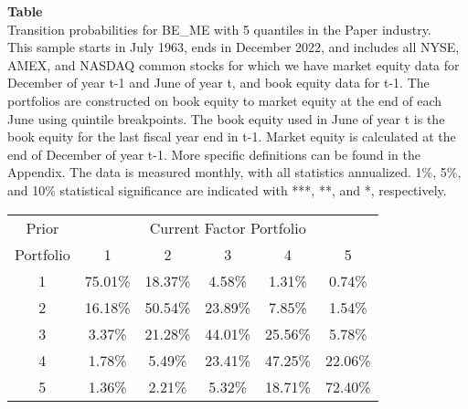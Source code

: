 \begin{table*}[ht!]
\raggedright
{}
\label{tab: transition_probs_BE_ME_Paper_with_5_quantiles}
\textbf{Table \thetable} \\
Transition probabilities for BE_ME with 5 quantiles in the Paper industry. \\
\hspace*{1em}This sample starts in July 1963, ends in December 2022, and includes all NYSE, AMEX, and NASDAQ common stocks for which we have market equity data for December of year t-1 and June of year t, and book equity data for t-1. The portfolios are constructed on book equity to market equity at the end of each June using quintile breakpoints.  The book equity used in June of year t is the book equity for the last fiscal year end in t-1.  Market equity is calculated at the end of December of year t-1.  More specific definitions can be found in the Appendix.  The data is measured monthly, with all statistics annualized.  1\%, 5\%, and 10\% statistical significance are indicated with ***, **, and *, respectively. \\
\vspace{0.5em}
\centering
\begin{adjustbox}{max width=\textwidth}
\begin{tabular}{@{}cccccc@{}}
\toprule
Prior & \multicolumn{5}{c}{Current Factor Portfolio} \\
Portfolio & 1 & 2 & 3 & 4 & 5 \\
\midrule
1 & 75.01\% & 18.37\% & 4.58\% & 1.31\% & 0.74\% \\
2 & 16.18\% & 50.54\% & 23.89\% & 7.85\% & 1.54\% \\
3 & 3.37\% & 21.28\% & 44.01\% & 25.56\% & 5.78\% \\
4 & 1.78\% & 5.49\% & 23.41\% & 47.25\% & 22.06\% \\
5 & 1.36\% & 2.21\% & 5.32\% & 18.71\% & 72.40\% \\
\bottomrule
\end{tabular}
\end{adjustbox}
\end{table*}